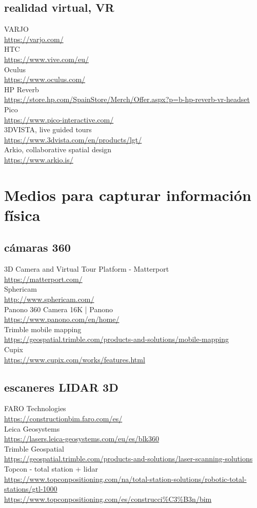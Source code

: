 \documentclass[spanish,12pt,a4paper,final,oneside]{book}
\begin{document}
\subsection{realidad virtual, VR}
VARJO \\ \url{https://varjo.com/}
\\ HTC \\ \url{https://www.vive.com/eu/}
\\ Oculus \\ \url{https://www.oculus.com/}
\\ HP Reverb \\ \url{https://store.hp.com/SpainStore/Merch/Offer.aspx?p=b-hp-reverb-vr-headset}
\\ Pico \\ \url{https://www.pico-interactive.com/}
\\ 3DVISTA, live guided tours \\ \url{https://www.3dvista.com/en/products/lgt/}
\\ Arkio, collaborative spatial design\\ \url{https://www.arkio.is/}

\section{Medios para capturar información física}
\subsection{cámaras 360}
3D Camera and Virtual Tour Platform - Matterport \\ \url{https://matterport.com/}
\\ Sphericam \\ \url{http://www.sphericam.com/}
\\ Panono 360 Camera 16K | Panono \\ \url{https://www.panono.com/en/home/}
\\ Trimble mobile mapping \\ \url{https://geospatial.trimble.com/products-and-solutions/mobile-mapping}
\\ Cupix \\ \url{https://www.cupix.com/works/features.html}

\subsection{escaneres LIDAR 3D}
FARO Technologies \\ \url{https://constructionbim.faro.com/es/}
\\ Leica Geosystems \\ \url{https://lasers.leica-geosystems.com/eu/es/blk360}
\\ Trimble Geospatial \\ \url{https://geospatial.trimble.com/products-and-solutions/laser-scanning-solutions}
\\ Topcon - total station + lidar \\ \url{https://www.topconpositioning.com/na/total-station-solutions/robotic-total-stations/gtl-1000} \\ \url{https://www.topconpositioning.com/es/construcci%C3%B3n/bim}
\end{document}
